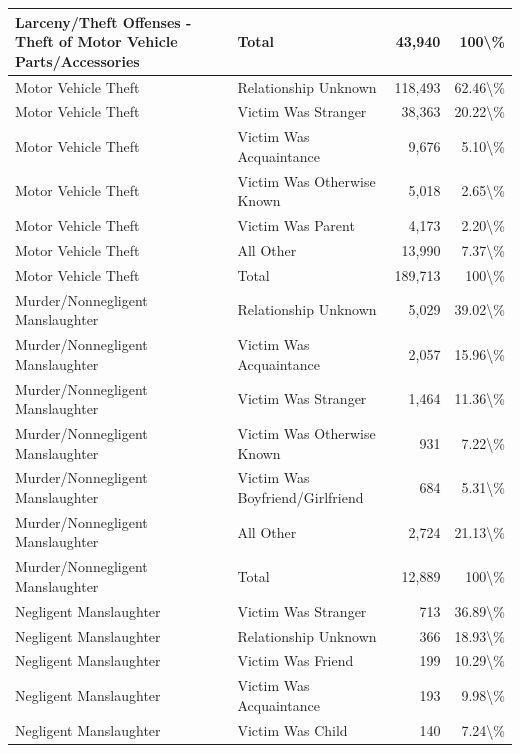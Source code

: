 \documentclass[
]{krantz}
\begin{document}
\begin{longtable}[t]{l|l|r|r}
\hline
Larceny/Theft Offenses - Theft of Motor Vehicle Parts/Accessories & Total & 43,940 & 100\textbackslash{}\%\\
\hline
Motor Vehicle Theft & Relationship Unknown & 118,493 & 62.46\textbackslash{}\%\\
\hline
Motor Vehicle Theft & Victim Was Stranger & 38,363 & 20.22\textbackslash{}\%\\
\hline
Motor Vehicle Theft & Victim Was Acquaintance & 9,676 & 5.10\textbackslash{}\%\\
\hline
Motor Vehicle Theft & Victim Was Otherwise Known & 5,018 & 2.65\textbackslash{}\%\\
\hline
Motor Vehicle Theft & Victim Was Parent & 4,173 & 2.20\textbackslash{}\%\\
\hline
Motor Vehicle Theft & All Other & 13,990 & 7.37\textbackslash{}\%\\
\hline
Motor Vehicle Theft & Total & 189,713 & 100\textbackslash{}\%\\
\hline
Murder/Nonnegligent Manslaughter & Relationship Unknown & 5,029 & 39.02\textbackslash{}\%\\
\hline
Murder/Nonnegligent Manslaughter & Victim Was Acquaintance & 2,057 & 15.96\textbackslash{}\%\\
\hline
Murder/Nonnegligent Manslaughter & Victim Was Stranger & 1,464 & 11.36\textbackslash{}\%\\
\hline
Murder/Nonnegligent Manslaughter & Victim Was Otherwise Known & 931 & 7.22\textbackslash{}\%\\
\hline
Murder/Nonnegligent Manslaughter & Victim Was Boyfriend/Girlfriend & 684 & 5.31\textbackslash{}\%\\
\hline
Murder/Nonnegligent Manslaughter & All Other & 2,724 & 21.13\textbackslash{}\%\\
\hline
Murder/Nonnegligent Manslaughter & Total & 12,889 & 100\textbackslash{}\%\\
\hline
Negligent Manslaughter & Victim Was Stranger & 713 & 36.89\textbackslash{}\%\\
\hline
Negligent Manslaughter & Relationship Unknown & 366 & 18.93\textbackslash{}\%\\
\hline
Negligent Manslaughter & Victim Was Friend & 199 & 10.29\textbackslash{}\%\\
\hline
Negligent Manslaughter & Victim Was Acquaintance & 193 & 9.98\textbackslash{}\%\\
\hline
Negligent Manslaughter & Victim Was Child & 140 & 7.24\textbackslash{}\%\\

\end{longtable}
\end{document}

